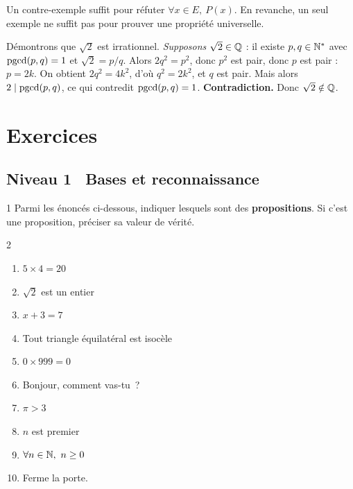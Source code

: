\begin{attention}
Un contre-exemple suffit pour r\'efuter $\forall x \in E,\ P(x)$.
En revanche, un seul exemple ne suffit pas pour prouver une propri\'et\'e
universelle.
\end{attention}

\begin{ex}
D\'emontrons que $\sqrt{2}$ est irrationnel.
\emph{Supposons} $\sqrt{2} \in \mathbb{Q}$ : il existe $p, q \in \mathbb{N}^*$ avec $\operatorname{pgcd}(p,q)=1$
et $\sqrt{2} = p/q$.
Alors $2q^2 = p^2$, donc $p^2$ est pair, donc $p$ est pair : $p = 2k$.
On obtient $2q^2 = 4k^2$, d'o\`u $q^2 = 2k^2$, et $q$ est pair.
Mais alors $2 \mid \operatorname{pgcd}(p,q)$, ce qui contredit $\operatorname{pgcd}(p,q)=1$. \textbf{Contradiction.}
Donc $\sqrt{2} \notin \mathbb{Q}$.
\end{ex}

\section{Exercices}

\subsection*{\quad Niveau 1 \textemdash\ Bases et reconnaissance}

\begin{exo}{1}
Parmi les \'enonc\'es ci-dessous, indiquer lesquels sont des \textbf{propositions}.
Si c'est une proposition, pr\'eciser sa valeur de v\'erit\'e.
\begin{multicols}{2}
\begin{enumerate}
  \item $5 \times 4 = 20$
  \item $\sqrt{2}$ est un entier
  \item $x + 3 = 7$
  \item Tout triangle \'equilat\'eral est isoc\`ele
  \item $0 \times 999 = 0$
  \item Bonjour, comment vas-tu~?
  \item $\pi > 3$
  \item $n$ est premier
  \item $\forall n \in \mathbb{N},\ n \geq 0$
  \item Ferme la porte.
\end{enumerate}
\end{multicols}
\end{exo}

